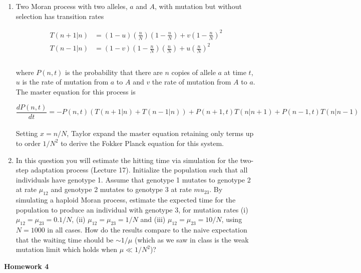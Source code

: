 \documentclass[12pt]{article}
\begin{document}
\begin{enumerate}
\item Two Moran process with two alleles, $a$ and $A$, with mutation but without selection has transition rates 

\begin{eqnarray*}
T(n+1|n)&=(1-u)\left(\frac{n}{N}\right)\left(1-\frac{n}{N}\right)+v\left(1-\frac{n}{N}\right)^2\\
T(n-1|n)&=(1-v)\left(1-\frac{n}{N}\right)\left(\frac{n}{N}\right)+u\left(\frac{n}{N}\right)^2\\
\end{eqnarray*}
\\
where $P(n,t)$ is the probability that there are $n$ copies of allele $a$ at time $t$, $u$ is the rate of mutation from $a$ to $A$ and $v$ the rate of mutation from $A$ to $a$. The master equation for this process is

\begin{equation*}
\frac{dP(n,t)}{dt}=-P(n,t)(T(n+1|n)+T(n-1|n))+P(n+1,t)T(n|n+1)+P(n-1,t)T(n|n-1)
\end{equation*}
\\
Setting $x=n/N$, Taylor expand the master equation retaining only terms up to order $1/N^2$ to derive the Fokker Planck equation for this system.

\item In this question you will estimate the hitting time via simulation for the two-step adaptation process (Lecture 17). Initialize the population such that all individuals have genotype 1. Assume that genotype 1 mutates to genotype 2 at rate $\mu_{12}$ and genotype 2 mutates to genotype 3 at rate $mu_{23}$. By simulating a haploid Moran process, estimate the expected time for the population to produce an individual with genotype 3, for mutation rates (i) $\mu_{12}=\mu_{23}=0.1/N$, (ii) $\mu_{12}=\mu_{23}=1/N$ and (iii)  $\mu_{12}=\mu_{23}=10/N$, using $N=1000$ in all cases. How do the results compare to the naive expectation that the waiting time should be $\sim 1/\mu$ (which as we saw in class is the weak mutation limit which holds when $\mu\ll 1/N^2$)?


\end{enumerate}


\clearpage 

\begin{center}
{\Large \bf Homework 4
\\ \vskip5mm }
\end{center}

\vskip5mm 
\end{document}

